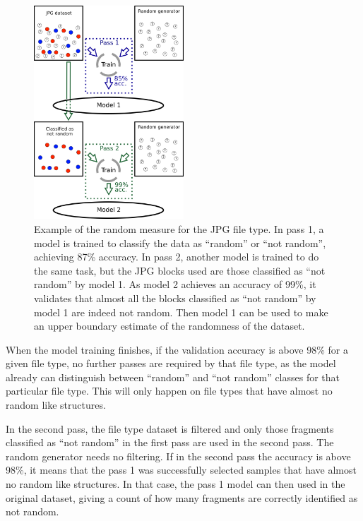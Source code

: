 \noindent
\begin{figure}[htb!]
\centering\includegraphics[width=0.50\textwidth]{content/random_measure.png}
\caption{\label{fig:randommeasure}Example of the random measure for the JPG file type. In pass 1, a model is trained to classify the data as ``random'' or ``not random'', achieving 87\% accuracy. In pass 2, another model is trained to do the same task, but the JPG blocks used are those classified as ``not random'' by model 1. As model 2 achieves an accuracy of 99\%, it validates that almost all the blocks classified as ``not random'' by model 1 are indeed not random. Then model 1 can be used to make an upper boundary estimate of the randomness of the dataset.}%
\end{figure}

When the model training finishes, if the validation accuracy is above 98\% for a given file type, no further passes are required by that file type, as the model already can distinguish between ``random'' and ``not random'' classes for that particular file type. This will only happen on file types that have almost no random like structures.

In the second pass, the file type dataset is filtered and only those fragments classified as ``not random'' in the first pass are used in the second pass. The random generator needs no filtering. If in the second pass the accuracy is above 98\%, it means that the pass 1 was successfully selected samples that have almost no random like structures. In that case, the pass 1 model can then used in the original dataset, giving a count of how many fragments are correctly identified as not random.

